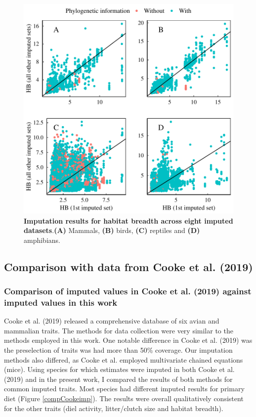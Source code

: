 \documentclass[11pt]{article}
\begin{document}
\begin{figure}[h!]
\centering
\includegraphics[scale=0.6]{figures/Congruence_continuous_traits/HB}
\caption[Imputation results for habitat breadth across eight imputed datasets]{\textbf{Imputation results for habitat breadth across eight imputed datasets}.\textbf{(A)} Mammals, \textbf{(B)} birds, \textbf{(C)} reptiles and \textbf{(D)} amphibians.}
\label{congruenceHB}
\end{figure}


\pagebreak

\subsection{Comparison with data from Cooke et al. (2019)}

\subsubsection{Comparison of imputed values in Cooke et al. (2019) against imputed values in this work}
Cooke et al. (2019) released a comprehensive database of six avian and mammalian traits. The methods for data collection were very similar to the methods employed in this work. One notable difference in Cooke et al. (2019) was the preselection of traits was had more than 50\% coverage. Our imputation methods also differed, as Cooke et al. employed multivariate chained equations (mice). Using species for which estimates were imputed in both Cooke et al. (2019) and in the present work, I compared the results of both methods for common imputed traits. Most species had different imputed results for  primary diet (Figure \ref{compCookeimp}). The results were overall qualitatively consistent for the other traits (diel activity, litter/clutch size and habitat breadth).
\end{document}
